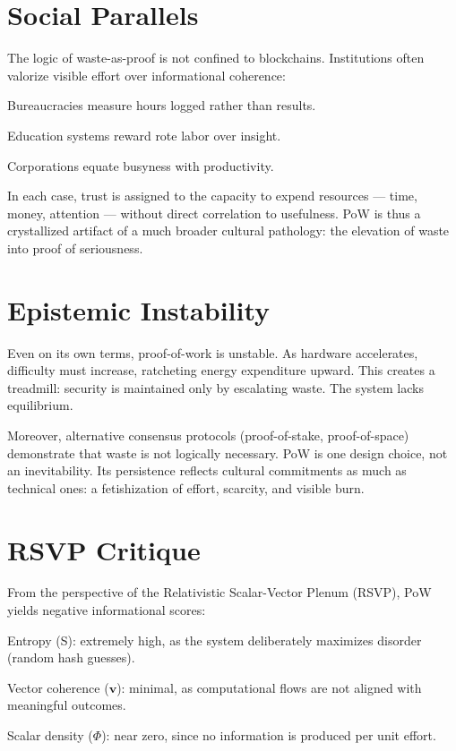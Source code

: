 \documentclass{book}
\begin{document}
\section{Social Parallels}

The logic of waste-as-proof is not confined to blockchains. Institutions often valorize visible effort over informational coherence:

Bureaucracies measure hours logged rather than results.

Education systems reward rote labor over insight.

Corporations equate busyness with productivity.

In each case, trust is assigned to the capacity to expend resources — time, money, attention — without direct correlation to usefulness. PoW is thus a crystallized artifact of a much broader cultural pathology: the elevation of waste into proof of seriousness.

\section{Epistemic Instability}

Even on its own terms, proof-of-work is unstable. As hardware accelerates, difficulty must increase, ratcheting energy expenditure upward. This creates a treadmill: security is maintained only by escalating waste. The system lacks equilibrium.

Moreover, alternative consensus protocols (proof-of-stake, proof-of-space) demonstrate that waste is not logically necessary. PoW is one design choice, not an inevitability. Its persistence reflects cultural commitments as much as technical ones: a fetishization of effort, scarcity, and visible burn.

\section{RSVP Critique}

From the perspective of the Relativistic Scalar-Vector Plenum (RSVP), PoW yields negative informational scores:

Entropy (S): extremely high, as the system deliberately maximizes disorder (random hash guesses).

Vector coherence (\(\mathbf{v}\)): minimal, as computational flows are not aligned with meaningful outcomes.

Scalar density (\(\Phi\)): near zero, since no information is produced per unit effort.
\end{document}
